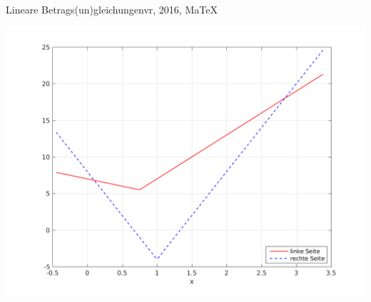 \begin{MAufgabe}{Lineare Betrags(un)gleichungen}{vr, 2016, MaTeX}
 \begin{center}
 \includegraphics[width=0.8\linewidth]{Abb_zur_Ag_autogenerated_abs_5.png} \end{center}
 
\else\relax\fi
 \end{MAufgabe}